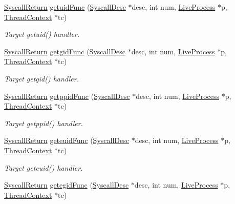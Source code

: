 \begin{DoxyCompactItemize}
\hyperlink{classSyscallReturn}{SyscallReturn} \hyperlink{syscall__emul_8hh_a383f24dfb168d66c98717246b91e01f5}{getuidFunc} (\hyperlink{classSyscallDesc}{SyscallDesc} $\ast$desc, int num, \hyperlink{classLiveProcess}{LiveProcess} $\ast$p, \hyperlink{classThreadContext}{ThreadContext} $\ast$tc)
\begin{DoxyCompactList}\small\item\em Target getuid() handler. \item\end{DoxyCompactList}\item 
\hyperlink{classSyscallReturn}{SyscallReturn} \hyperlink{syscall__emul_8hh_aada0d031ba405f7dd4846a72102aa413}{getgidFunc} (\hyperlink{classSyscallDesc}{SyscallDesc} $\ast$desc, int num, \hyperlink{classLiveProcess}{LiveProcess} $\ast$p, \hyperlink{classThreadContext}{ThreadContext} $\ast$tc)
\begin{DoxyCompactList}\small\item\em Target getgid() handler. \item\end{DoxyCompactList}\item 
\hyperlink{classSyscallReturn}{SyscallReturn} \hyperlink{syscall__emul_8hh_a7bfc2fd0fff906f4fcf3798992aa385c}{getppidFunc} (\hyperlink{classSyscallDesc}{SyscallDesc} $\ast$desc, int num, \hyperlink{classLiveProcess}{LiveProcess} $\ast$p, \hyperlink{classThreadContext}{ThreadContext} $\ast$tc)
\begin{DoxyCompactList}\small\item\em Target getppid() handler. \item\end{DoxyCompactList}\item 
\hyperlink{classSyscallReturn}{SyscallReturn} \hyperlink{syscall__emul_8hh_aff2ca2b37136cae14bf6677989f38a52}{geteuidFunc} (\hyperlink{classSyscallDesc}{SyscallDesc} $\ast$desc, int num, \hyperlink{classLiveProcess}{LiveProcess} $\ast$p, \hyperlink{classThreadContext}{ThreadContext} $\ast$tc)
\begin{DoxyCompactList}\small\item\em Target geteuid() handler. \item\end{DoxyCompactList}\item 
\hyperlink{classSyscallReturn}{SyscallReturn} \hyperlink{syscall__emul_8hh_ae1874a907c0abc563157b5e6cca909f4}{getegidFunc} (\hyperlink{classSyscallDesc}{SyscallDesc} $\ast$desc, int num, \hyperlink{classLiveProcess}{LiveProcess} $\ast$p, \hyperlink{classThreadContext}{ThreadContext} $\ast$tc)

\end{DoxyCompactItemize}
